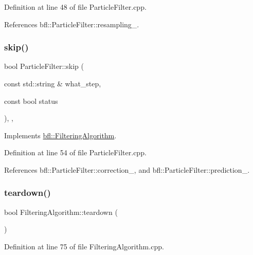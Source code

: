 Definition at line 48 of file Particle\+Filter.\+cpp.



References bfl\+::\+Particle\+Filter\+::resampling\+\_\+.

\mbox{\label{classbfl_1_1ParticleFilter_a2d7a5e7aaad179037273d35be229056d}} 
\subsubsection{\texorpdfstring{skip()}{skip()}}
{\footnotesize\ttfamily bool Particle\+Filter\+::skip (\begin{DoxyParamCaption}\item[{const std\+::string \&}]{what\+\_\+step,  }\item[{const bool}]{status }\end{DoxyParamCaption})\hspace{0.3cm}{\ttfamily [override]}, {\ttfamily [virtual]}, {\ttfamily [inherited]}}



Implements \mbox{\hyperlink{classbfl_1_1FilteringAlgorithm_ac8a718a614905d89d6a43bbbc70d68b2}{bfl\+::\+Filtering\+Algorithm}}.



Definition at line 54 of file Particle\+Filter.\+cpp.



References bfl\+::\+Particle\+Filter\+::correction\+\_\+, and bfl\+::\+Particle\+Filter\+::prediction\+\_\+.

\mbox{\label{classbfl_1_1FilteringAlgorithm_a1dc912d89ee8f96d4f3e8209865c5308}} 
\subsubsection{\texorpdfstring{teardown()}{teardown()}}
{\footnotesize\ttfamily bool Filtering\+Algorithm\+::teardown (\begin{DoxyParamCaption}{ }\end{DoxyParamCaption})\hspace{0.3cm}{\ttfamily [inherited]}}



Definition at line 75 of file Filtering\+Algorithm.\+cpp.



